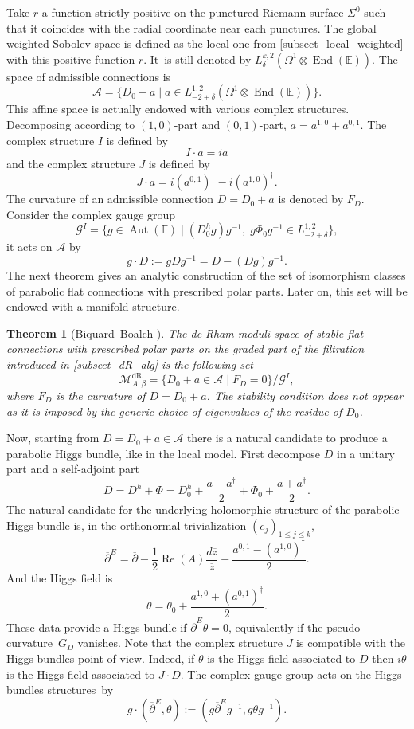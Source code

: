 \documentclass[11pt]{article}
\newcommand{\dR}{\mathrm{dR}}
\theoremstyle{definition}
\theoremstyle{plain}
\newtheorem{theorem}[definition]{Theorem}
\DeclareMathOperator{\End}{End}
\DeclareMathOperator{\Aut}{Aut}
\DeclareMathOperator{\Ree}{Re}
\newcommand{\inv}{^{-1}}
\begin{document}
Take $r$ a function strictly positive on the punctured Riemann surface $\Sigma^0$ such that it coincides with the radial coordinate near each punctures. The global weighted Sobolev space is defined as the local one from \ref{subsect_local_weighted} with this positive function $r$. It~is still denoted by $L^{k,2}_{\delta}(\Omega^1\otimes \End{(\mathbb{E})})$. The space of admissible connections is
\[
\mathcal{A} =\lbrace D_0 + a \mid a \in L^{1,2}_{-2+\delta}(\Omega^1\otimes \End(\mathbb{E}))\rbrace.
\]
This affine space is actually endowed with various complex structures. Decomposing according to $(1,0)$-part and $(0,1)$-part, $a=a^{1,0}+a^{0,1}$. The complex structure $I$ is defined by
\[
I\cdot a = i a
\]
and the complex structure $J$ is defined by
\[
J\cdot a = i(a^{0,1})^{\dagger}-i(a^{1,0})^{\dagger}.
\]
The curvature of an admissible connection $D=D_0 + a$ is denoted by $F_D$. Consider the complex gauge group
\[
\mathcal{G}^I=\lbrace g\in\Aut(\mathbb{E}) \mid (D_0^h g) g\inv, \; g \Phi_0 g\inv \in L^{1,2}_{-2+\delta}\rbrace,
\]
it acts on $ \mathcal{A}$ by
\[
g\cdot D := g D g\inv = D -(D g)g\inv.
\]
The next theorem gives an analytic construction of the set of isomorphism classes of parabolic flat connections with prescribed polar parts. Later on, this set will be endowed with a manifold structure.

\begin{theorem}[Biquard--Boalch {\cite[\S8]{Biquard_Boalch_2004}}]
The de Rham moduli space of stable flat connections with prescribed polar parts on the graded part of the filtration introduced in \ref{subsect_dR_alg} is the following set
\[
\mathcal{M}^{\dR}_{A, \beta} =\lbrace D_0 + a \in \mathcal{A} \mid F_D =0\rbrace/ \mathcal{G}^{I},
\]
where $F_D$ is the curvature of $D=D_0+a$. The stability condition does not appear as it is imposed by the generic choice of eigenvalues of the residue of $D_0$.
\end{theorem}

Now, starting from $ D=D_0 +a \in \mathcal{A}$ there is a natural candidate to produce a parabolic Higgs bundle, like in the local model. First decompose $D$ in a unitary part and a self-adjoint part
\[
D =D^h + \Phi= D_0^h +\frac{a-a^{\dagger}}{2} + \Phi_0 + \frac{ a + a^{\dagger}}{2}.
\]
The natural candidate for the underlying holomorphic structure of the parabolic Higgs bundle is, in the orthonormal trivialization $(e_j)_{1\le j \le k}$,
\[
\overline{\partial}^E = \overline{\partial} - \frac{1}{2} \Ree(A) \frac{d\overline{z}}{\overline{z}} + \frac{a^{0,1}-(a^{1,0})^{\dagger}}{2}.
\]
And the Higgs field is
\[
\theta = \theta_0 + \frac{a^{1,0} + (a^{0,1})^{\dagger}}{2}.
\]
These data provide a Higgs bundle if $\overline{\partial}^E \theta =0$, equivalently if the pseudo curvature~$G_D$ vanishes. Note that the complex structure $J$ is compatible with the Higgs bundles point of view. Indeed, if $\theta$ is the Higgs field associated to $D$ then $i \theta$ is the Higgs field associated to $J\cdot D$. The complex gauge group acts on the Higgs bundles structures~by
\[
g\cdot(\overline{\partial}^E,\theta) :=(g \overline{\partial}^E g\inv,g \theta g\inv).
\]
\end{document}
